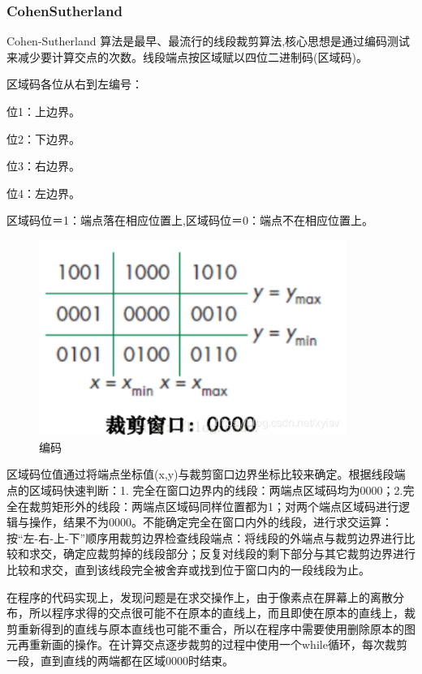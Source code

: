 \documentclass[a4paper,UTF8]{article}
\theoremstyle{definition}
\begin{document}
\subsubsection{CohenSutherland}
\par Cohen-Sutherland 算法是最早、最流行的线段裁剪算法,核心思想是通过编码测试来减少要计算交点的次数。线段端点按区域赋以四位二进制码(区域码)。
\par 区域码各位从右到左编号：
\par 位1：上边界。
\par 位2：下边界。
\par 位3：右边界。
\par 位4：左边界。
\par 区域码位＝1：端点落在相应位置上,区域码位＝0：端点不在相应位置上。
\par
\begin{figure}[ht]
\centering
\includegraphics[width=10cm]{s1.png}
\caption{编码}
\label{s1}
\end{figure}
\par
\par 区域码位值通过将端点坐标值(x,y)与裁剪窗口边界坐标比较来确定。根据线段端点的区域码快速判断：1. 完全在窗口边界内的线段：两端点区域码均为0000；2.完全在裁剪矩形外的线段：两端点区域码同样位置都为1；对两个端点区域码进行逻辑与操作，结果不为0000。不能确定完全在窗口内外的线段，进行求交运算：按“左-右-上-下”顺序用裁剪边界检查线段端点：将线段的外端点与裁剪边界进行比较和求交，确定应裁剪掉的线段部分；反复对线段的剩下部分与其它裁剪边界进行比较和求交，直到该线段完全被舍弃或找到位于窗口内的一段线段为止。
\par 在程序的代码实现上，发现问题是在求交操作上，由于像素点在屏幕上的离散分布，所以程序求得的交点很可能不在原本的直线上，而且即使在原本的直线上，裁剪重新得到的直线与原本直线也可能不重合，所以在程序中需要使用删除原本的图元再重新画的操作。在计算交点逐步裁剪的过程中使用一个while循环，每次裁剪一段，直到直线的两端都在区域0000时结束。
\par 
\end{document}
